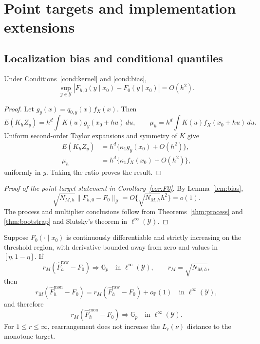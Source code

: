 \section{Point targets and implementation extensions}
\label{sec:supp-extensions}

\subsection{Localization bias and conditional quantiles}

\begin{lemma}
\label{lem:bias}
Under Conditions~\ref{cond:kernel} and \ref{cond:bias},
\[
\sup_{y\in\mathcal Y}
|F_{h,0}(y\mid x_0)-F_0(y\mid x_0)|
=O(h^2).
\]
\end{lemma}

\begin{proof}
Let \(g_y(x)=q_{0,y}(x)f_X(x)\). Then
\[
E(K_hZ_y)
=h^d\int K(u)g_y(x_0+hu)\,du,
\qquad
\mu_h=h^d\int K(u)f_X(x_0+hu)\,du.
\]
Uniform second-order Taylor expansions and symmetry of \(K\) give
\begin{align*}
E(K_hZ_y)
&=h^d\{\kappa_1g_y(x_0)+O(h^2)\},\\
\mu_h
&=h^d\{\kappa_1f_X(x_0)+O(h^2)\},
\end{align*}
uniformly in \(y\). Taking the ratio proves the result.
\end{proof}

\begin{proof}[Proof of the point-target statement in Corollary~\ref{cor:F0}]
By Lemma~\ref{lem:bias},
\[
\sqrt{N_{M,h}}
\|F_{h,0}-F_0\|_{\mathcal Y}
=O\{\sqrt{N_{M,h}}h^2\}=o(1).
\]
The process and multiplier conclusions follow from Theorems~\ref{thm:process} and \ref{thm:bootstrap} and Slutsky's theorem in \(\ell^\infty(\mathcal Y)\).
\end{proof}

\begin{proposition}
\label{prop:rearrangement}
Suppose \(F_0(\cdot\mid x_0)\) is continuously differentiable and strictly increasing on the threshold region, with derivative bounded away from zero and values in \([\eta,1-\eta]\). If
\[
r_M(\widehat F_h^{\mathrm{raw}}-F_0)
\Rightarrow\mathbb G_p
\quad\text{in }\ell^\infty(\mathcal Y),
\qquad
r_M=\sqrt{N_{M,h}},
\]
then
\begin{equation}
r_M(\widehat F_h^{\mathrm{mon}}-F_0)
=
r_M(\widehat F_h^{\mathrm{raw}}-F_0)
+o_{\mathbb P}(1)
\quad\text{in }\ell^\infty(\mathcal Y),
\label{eq:rearrangement-equivalence}
\end{equation}
and therefore
\[
r_M(\widehat F_h^{\mathrm{mon}}-F_0)
\Rightarrow\mathbb G_p
\quad\text{in }\ell^\infty(\mathcal Y).
\]
For \(1\le r\le\infty\), rearrangement does not increase the \(L_r(\nu)\) distance to the monotone target.
\end{proposition}

